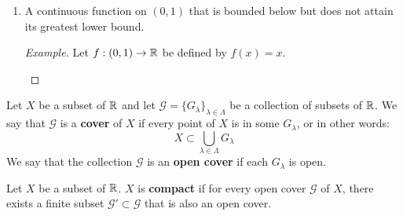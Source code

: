 \documentclass[../main.tex]{subfiles}
\begin{document}
\begin{exercise}
\begin{enumerate}[label={\alph*)}]
\begin{proof}[Example]
\begin{center}
            \end{center}
        \end{proof}
        \item A continuous function on $(0,1)$ that is bounded below but does not attain its greatest lower bound.
        \begin{proof}[Example]
            Let $f:(0,1)\to\mathbb{R}$ be defined by $f(x)=x$.
            \begin{center}
            \end{center}
        \end{proof}
    \end{enumerate}
\end{exercise}

\begin{definition}\label{dfn:10.3}
    Let $X$ be a subset of $\mathbb{R}$ and let $\mathcal{G}=\{G_\lambda\}_{\lambda\in\Lambda}$ be a collection of subsets of $\mathbb{R}$. We say that $\mathcal{G}$ is a \textbf{cover} of $X$ if every point of $X$ is in some $G_\lambda$, or in other words:
    \begin{equation*}
        X \subset \bigcup_{\lambda\in\Lambda}G_\lambda
    \end{equation*}
    We say that the collection $\mathcal{G}$ is an \textbf{open cover} if each $G_\lambda$ is open.
\end{definition}

\begin{definition}\label{dfn:10.4}
    Let $X$ be a subset of $\mathbb{R}$. $X$ is \textbf{compact} if for every open cover $\mathcal{G}$ of $X$, there exists a finite subset $\mathcal{G}'\subset\mathcal{G}$ that is also an open cover.
\end{definition}
\end{document}
